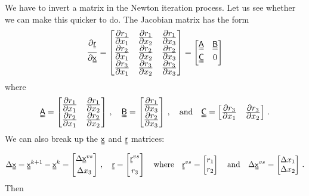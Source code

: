 We have to invert a matrix in the Newton iteration process.  Let us see whether we can make this 
quicker to do.  The Jacobian matrix has the form
\[
  \Partial{\Mr}{\Mx} = \begin{bmatrix}\Partial{r_1}{x_1} & \Partial{r_1}{x_2} & \Partial{r_1}{x_3} \\
     \Partial{r_2}{x_1} & \Partial{r_2}{x_2} & \Partial{r_2}{x_3} \\
     \Partial{r_3}{x_1} & \Partial{r_3}{x_2} & \Partial{r_3}{x_3} \end{bmatrix} 
     = \begin{bmatrix} \MAmat & \MBmat \\ \MCmat & 0 \end{bmatrix}
\]
where
\[
  \MAmat = \begin{bmatrix}\Partial{r_1}{x_1} & \Partial{r_1}{x_2} \\
                       \Partial{r_2}{x_1} & \Partial{r_2}{x_2} \end{bmatrix} \,,\quad
  \MBmat = \begin{bmatrix}\Partial{r_1}{x_3} \\ \Partial{r_2}{x_3} \end{bmatrix} \,,\quad \Tand \quad
  \MCmat = \begin{bmatrix}\Partial{r_3}{x_1} & \Partial{r_3}{x_2} \end{bmatrix} \,.
\]
We can also break up the $\Mx$ and $\Mr$ matrices:
\[
  \Delta\Mx = \Mx^{k+1}-\Mx^k = \begin{bmatrix} \Delta\Mx^{vs} \\ \Delta x_3 \end{bmatrix} \,, \quad
  \Mr = \begin{bmatrix} \Mr^{vs} \\ r_3 \end{bmatrix}
  \quad \text{where} \quad \Mr^{vs} = \begin{bmatrix} r_1 \\ r_2 \end{bmatrix}  
   \quad \Tand \quad \Delta\Mx^{vs} = \begin{bmatrix}\Delta x_1 \\\Delta x_2 \end{bmatrix}  \,.
\]
Then
